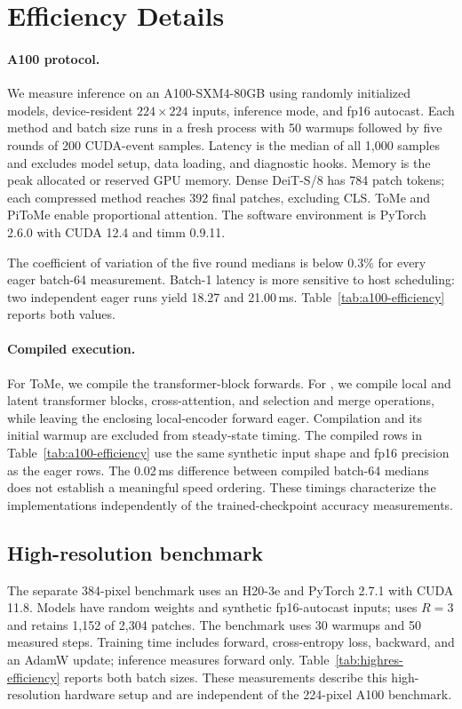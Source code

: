 \section{Efficiency Details}
\label{app:followup}

\paragraph{A100 protocol.}
We measure inference on an A100-SXM4-80GB using randomly initialized
models, device-resident $224\times224$ inputs, inference mode, and fp16
autocast. Each method and batch size runs in a fresh process with 50
warmups followed by five rounds of 200 CUDA-event samples. Latency is
the median of all 1,000 samples and excludes model setup, data loading,
and diagnostic hooks. Memory is the peak allocated or reserved GPU memory.
Dense DeiT-S/8 has 784 patch tokens; each compressed method reaches 392
final patches, excluding CLS. ToMe and PiToMe enable proportional attention.
The software environment is PyTorch 2.6.0 with CUDA 12.4 and timm 0.9.11.

The coefficient of variation of the five round medians is below 0.3\%
for every eager batch-64 measurement. Batch-1 latency is more sensitive
to host scheduling: two independent eager \mn{} runs yield 18.27 and
21.00\,ms. Table~\ref{tab:a100-efficiency} reports both values.

\paragraph{Compiled execution.}
For ToMe, we compile the transformer-block forwards. For \mn{}, we compile
local and latent transformer blocks, cross-attention, and selection and
merge operations, while leaving the enclosing local-encoder forward eager.
Compilation and its initial warmup are excluded from steady-state timing.
The compiled rows in Table~\ref{tab:a100-efficiency} use the same synthetic
input shape and fp16 precision as the eager rows. The 0.02\,ms difference
between compiled batch-64 medians does not establish a meaningful speed
ordering. These timings characterize the implementations independently
of the trained-checkpoint accuracy measurements.

\subsection{High-resolution benchmark}
\label{app:highres-efficiency}

The separate 384-pixel benchmark uses an H20-3e and PyTorch 2.7.1 with
CUDA 11.8. Models have random weights and synthetic fp16-autocast inputs;
\mn{} uses $R=3$ and retains 1,152 of 2,304 patches. The benchmark
uses 30 warmups and 50 measured steps. Training time includes forward,
cross-entropy loss, backward, and an AdamW update; inference measures
forward only. Table~\ref{tab:highres-efficiency} reports both batch sizes.
These measurements describe this high-resolution hardware setup and
are independent of the 224-pixel A100 benchmark.

